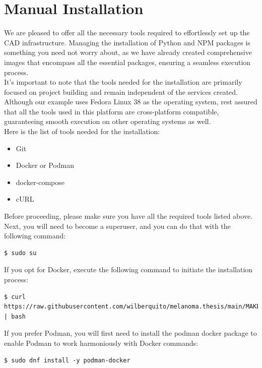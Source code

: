 \section{Manual Installation}
\label{appendix:appendix_a}

We are pleased to offer all the necessary tools required to effortlessly set up the CAD infrastructure.
Managing the installation of Python and NPM packages is something you need not worry about,
as we have already created comprehensive images that encompass all the essential packages,
ensuring a seamless execution process. \\

It's important to note that the tools needed for the installation are
primarily focused on project building and remain independent of the services created.
Although our example uses Fedora Linux 38 as the operating system,
rest assured that all the tools used in this platform are cross-platform compatible,
guaranteeing smooth execution on other operating systems as well. \\


Here is the list of tools needed for the installation:

\begin{itemize}
  \item Git
  \item Docker or Podman
  \item docker-compose
  \item cURL
\end{itemize}

Before proceeding, please make sure you have all the required tools listed above.
Next, you will need to become a superuser, and you can do that with the following command:

\begin{Verbatim}[fontsize=\scriptsize]
$ sudo su
\end{Verbatim}

If you opt for Docker, execute the following command to initiate the installation process:

\begin{Verbatim}[fontsize=\scriptsize]
$ curl https://raw.githubusercontent.com/wilberquito/melanoma.thesis/main/MAKE.sh | bash
\end{Verbatim}

If you prefer Podman,
you will first need to install the podman docker package to enable Podman to work harmoniously with Docker commands:

\begin{Verbatim}[fontsize=\scriptsize]
$ sudo dnf install -y podman-docker
\end{Verbatim}

